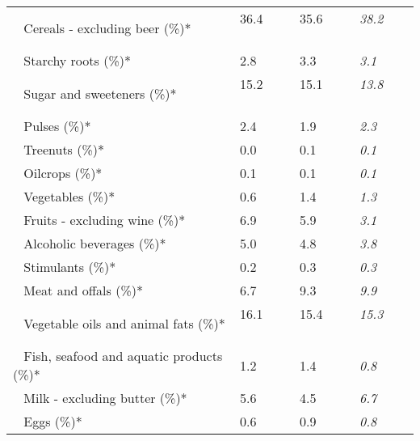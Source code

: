 \begin{tabular}{L{3.9cm} R{1cm} R{1cm} R{1cm}}
	 ~ Cereals - excluding beer (\%)* & 36.4 ~ \ \ & 35.6 ~ \ \ & \textit{38.2} ~ \ \ \\ 
	 ~ Starchy roots (\%)* & 2.8 ~ \ \ & 3.3 ~ \ \ & \textit{3.1} ~ \ \ \\ 
	 ~ Sugar and sweeteners (\%)* & 15.2 ~ \ \ & 15.1 ~ \ \ & \textit{13.8} ~ \ \ \\ 
	 ~ Pulses (\%)* & 2.4 ~ \ \ & 1.9 ~ \ \ & \textit{2.3} ~ \ \ \\ 
	 ~ Treenuts (\%)* & 0.0 ~ \ \ & 0.1 ~ \ \ & \textit{0.1} ~ \ \ \\ 
	 ~ Oilcrops (\%)* & 0.1 ~ \ \ & 0.1 ~ \ \ & \textit{0.1} ~ \ \ \\ 
	 ~ Vegetables (\%)* & 0.6 ~ \ \ & 1.4 ~ \ \ & \textit{1.3} ~ \ \ \\ 
	 ~ Fruits - excluding wine (\%)* & 6.9 ~ \ \ & 5.9 ~ \ \ & \textit{3.1} ~ \ \ \\ 
	 ~ Alcoholic beverages (\%)* & 5.0 ~ \ \ & 4.8 ~ \ \ & \textit{3.8} ~ \ \ \\ 
	 ~ Stimulants (\%)* & 0.2 ~ \ \ & 0.3 ~ \ \ & \textit{0.3} ~ \ \ \\ 
	 ~ Meat and offals (\%)* & 6.7 ~ \ \ & 9.3 ~ \ \ & \textit{9.9} ~ \ \ \\ 
	 ~ Vegetable oils and animal fats (\%)* & 16.1 ~ \ \ & 15.4 ~ \ \ & \textit{15.3} ~ \ \ \\ 
	 ~ Fish, seafood and aquatic products (\%)* & 1.2 ~ \ \ & 1.4 ~ \ \ & \textit{0.8} ~ \ \ \\ 
	 ~ Milk - excluding butter (\%)* & 5.6 ~ \ \ & 4.5 ~ \ \ & \textit{6.7} ~ \ \ \\ 
	 ~ Eggs (\%)* & 0.6 ~ \ \ & 0.9 ~ \ \ & \textit{0.8} ~ \ \ \\ 
       \toprule
      \end{tabular}
      \clearpage
{}
